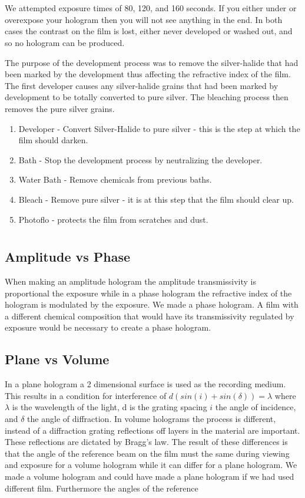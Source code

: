 \documentclass[11pt,letterpaper]{article}
\begin{document}
\section{} %
We attempted exposure times of 80, 120, and 160 seconds. If you either under or overexpose your hologram then you will not see anything in the end. In both cases the contrast on the film is lost, either never developed or washed out, and so no hologram can be produced.

The purpose of the development process was to remove the silver-halide that had been marked by the development thus affecting the refractive index of the film. The first developer causes any silver-halide grains that had been marked by development to be totally converted to pure silver. The bleaching process then removes the pure silver grains.
\begin{enumerate}
\item Developer - Convert Silver-Halide to pure silver - this is the step at which the film should darken.
\item Bath - Stop the development process by neutralizing the developer.
\item Water Bath - Remove chemicals from previous baths.
\item Bleach - Remove pure silver - it is at this step that the film should clear up.
\item Photoflo - protects the film from scratches and dust.
\end{enumerate}




\section{} %
\subsection{Amplitude vs Phase}
When making an amplitude hologram the amplitude transmissivity is proportional the exposure while in a phase hologram the refractive index of the hologram is modulated by the exposure. We made a phase hologram. A film with a different chemical composition that would have its transmissivity regulated by exposure would be necessary to create a phase hologram.
\subsection{Plane vs Volume}
In a plane hologram a 2 dimensional surface is used as the recording medium. This results in a condition for interference of $d(sin(i)+sin(\delta))=\lambda$ where $\lambda$ is the wavelength of the light, d is the grating spacing $i$ the angle of incidence, and $\delta$ the angle of diffraction. In volume holograms the process is different, instead of a diffraction grating reflections off layers in the material are important. These reflections are dictated by Bragg's law. The result of these differences is that the angle of the reference beam on the film must the same during viewing and exposure for a volume hologram while it can differ for a plane hologram. We made a volume hologram and could have made a plane hologram if we had used different film.
Furthermore the angles of the reference
\end{document}

